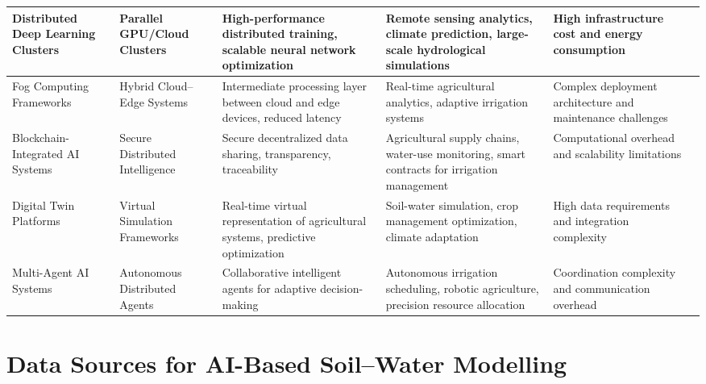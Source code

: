 \documentclass[land,article,submit,pdftex,moreauthors]{Definitions/mdpi}
\numberwithin{equation}{section}
\begin{document}
\begin{longtable}{p{1.4cm} p{1.4cm} p{3.2cm} p{3.2cm} p{2.4cm} p{1.6cm}}
Distributed Deep Learning Clusters &
Parallel GPU/Cloud Clusters &
High-performance distributed training, scalable neural network optimization &
Remote sensing analytics, climate prediction, large-scale hydrological simulations &
High infrastructure cost and energy consumption &
\citep{Dean2012, BenNun2019, Verbraeken2020} \\ \hline

Fog Computing Frameworks &
Hybrid Cloud--Edge Systems &
Intermediate processing layer between cloud and edge devices, reduced latency &
Real-time agricultural analytics, adaptive irrigation systems &
Complex deployment architecture and maintenance challenges &
\citep{Bonomi2012, Gill2019, Mahmood2022} \\ \hline

Blockchain-Integrated AI Systems &
Secure Distributed Intelligence &
Secure decentralized data sharing, transparency, traceability &
Agricultural supply chains, water-use monitoring, smart contracts for irrigation management &
Computational overhead and scalability limitations &
\citep{Ferrag2020, Lin2020, Casino2019, Reyna2018} \\ \hline

Digital Twin Platforms &
Virtual Simulation Frameworks &
Real-time virtual representation of agricultural systems, predictive optimization &
Soil-water simulation, crop management optimization, climate adaptation &
High data requirements and integration complexity &
\citep{Pylianidis2021, Verdouw2021, Skobelev2021} \\ \hline

Multi-Agent AI Systems &
Autonomous Distributed Agents &
Collaborative intelligent agents for adaptive decision-making &
Autonomous irrigation scheduling, robotic agriculture, precision resource allocation &
Coordination complexity and communication overhead &
\citep{Wooldridge2009, Dorri2018, Chlingaryan2018} \\

\end{longtable}
\normalsize

\section{Data Sources for AI-Based Soil--Water Modelling}
\end{document}
